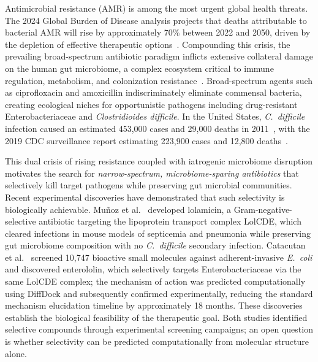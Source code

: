 \documentclass{article}
\begin{document}
Antimicrobial resistance (AMR) is among the most urgent global health threats.
The 2024 Global Burden of Disease analysis projects that deaths attributable to bacterial AMR will rise by approximately 70\% between 2022 and 2050, driven by the depletion of effective therapeutic options~\citep{gbd2024}.
Compounding this crisis, the prevailing broad-spectrum antibiotic paradigm inflicts extensive collateral damage on the human gut microbiome, a complex ecosystem critical to immune regulation, metabolism, and colonization resistance~\citep{buffie2013,becattini2016}.
Broad-spectrum agents such as ciprofloxacin and amoxicillin indiscriminately eliminate commensal bacteria, creating ecological niches for opportunistic pathogens including drug-resistant Enterobacteriaceae and \textit{Clostridioides difficile}.
In the United States, \textit{C.~difficile} infection caused an estimated 453,000 cases and 29,000 deaths in 2011~\citep{lessa2015}, with the 2019 CDC surveillance report estimating 223,900 cases and 12,800 deaths~\citep{cdc2019cdi}.

This dual crisis of rising resistance coupled with iatrogenic microbiome disruption motivates the search for \emph{narrow-spectrum, microbiome-sparing antibiotics} that selectively kill target pathogens while preserving gut microbial communities.
Recent experimental discoveries have demonstrated that such selectivity is biologically achievable.
Mu\~{n}oz et al.~\citep{munoz2024} developed lolamicin, a Gram-negative-selective antibiotic targeting the lipoprotein transport complex LolCDE, which cleared infections in mouse models of septicemia and pneumonia while preserving gut microbiome composition with no \textit{C.~difficile} secondary infection.
Catacutan et al.~\citep{catacutan2025} screened 10,747 bioactive small molecules against adherent-invasive \textit{E.~coli} and discovered enterololin, which selectively targets Enterobacteriaceae via the same LolCDE complex; the mechanism of action was predicted computationally using DiffDock and subsequently confirmed experimentally, reducing the standard mechanism elucidation timeline by approximately 18 months.
These discoveries establish the biological feasibility of the therapeutic goal. Both studies identified selective compounds through experimental screening campaigns; an open question is whether selectivity can be predicted computationally from molecular structure alone.
\end{document}
